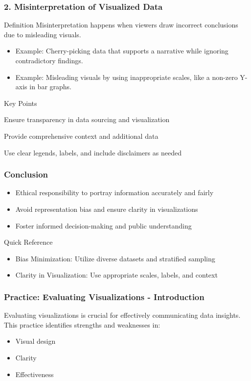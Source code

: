 \documentclass[aspectratio=169]{beamer}
\begin{document}
\begin{frame}[fragile]
    \frametitle{2. Misinterpretation of Visualized Data}
    \begin{block}{Definition}
        Misinterpretation happens when viewers draw incorrect conclusions due to misleading visuals.
    \end{block}
    \begin{itemize}
        \item Example: Cherry-picking data that supports a narrative while ignoring contradictory findings.
        \item Example: Misleading visuals by using inappropriate scales, like a non-zero Y-axis in bar graphs.
    \end{itemize}
    \begin{block}{Key Points}
        \item Ensure transparency in data sourcing and visualization
        \item Provide comprehensive context and additional data
        \item Use clear legends, labels, and include disclaimers as needed
    \end{block}
\end{frame}

\begin{frame}[fragile]
    \frametitle{Conclusion}
    \begin{itemize}
        \item Ethical responsibility to portray information accurately and fairly
        \item Avoid representation bias and ensure clarity in visualizations
        \item Foster informed decision-making and public understanding
    \end{itemize}
    \begin{block}{Quick Reference}
        \begin{itemize}
            \item Bias Minimization: Utilize diverse datasets and stratified sampling
            \item Clarity in Visualization: Use appropriate scales, labels, and context
        \end{itemize}
    \end{block}
\end{frame}

\begin{frame}[fragile]
    \frametitle{Practice: Evaluating Visualizations - Introduction}
    Evaluating visualizations is crucial for effectively communicating data insights. This practice identifies strengths and weaknesses in:
    \begin{itemize}
        \item Visual design
        \item Clarity
        \item Effectiveness
    \end{itemize}
\end{frame}
\end{document}
